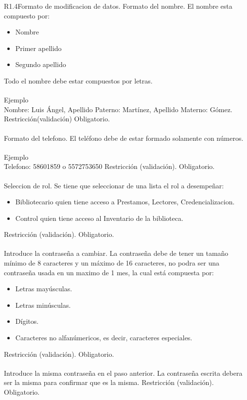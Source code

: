 \begin{BussinesRule}{R1.4}{Formato de modificacion de datos.} 
	\BRitem[Nombre:] Formato del nombre.
	\BRitem[Descripción:] El nombre esta compuesto por:
		\begin{itemize} 
			\item Nombre
			\item Primer apellido
			\item Segundo apellido 
		\end{itemize}
		Todo el nombre debe estar compuestos por letras.\\\\
	Ejemplo \\
	Nombre: Luis Ángel, Apellido Paterno: Martínez, Apellido Materno: Gómez.
	\BRitem[Tipo:] Restricción(validación)
	\BRitem[Nivel:] Obligatorio.\\\\

	\BRitem[Telefono:] Formato del telefono.
	\BRitem[Descripción:] El teléfono debe de estar formado solamente con números.\\\\
	Ejemplo \\
	Telefono: 58601859 o 5572753650
	\BRitem[Tipo:] Restricción (validación).
	\BRitem[Nivel:] Obligatorio.\\\\

	 Seleccion de rol.
	\BRitem[Descripción:] Se tiene que seleccionar de una lista el rol a desempeñar:
		\begin{itemize} 
			\item Bibliotecario quien tiene acceso a Prestamos, Lectores, Credencializacion.
			\item Control quien tiene acceso al Inventario de la biblioteca.
		\end{itemize}
	\BRitem[Tipo:] Restricción (validación).
	\BRitem[Nivel:] Obligatorio.\\\\

	\BRitem[Contraseña:] Introduce la contraseña a cambiar.
	\BRitem[Descripción:] La contraseña debe de tener un tamaño mínimo de 8 caracteres y un máximo de 16 caracteres, no podra ser una contraseña usada en un maximo de 1 mes, la cual está compuesta por:
		\begin{itemize}	
			\item Letras mayúsculas.
			\item Letras minúsculas.
			\item Dígitos.
			\item Caracteres no alfanúmericos, es decir, caracteres especiales.
		\end{itemize}
	\BRitem[Tipo:] Restricción (validación).
	\BRitem[Nivel:] Obligatorio.\\\\

	 Introduce la misma contraseña en el paso anterior.
	\BRitem[Descripción:] La contraseña escrita debera ser la misma para confirmar que es la misma.
	\BRitem[Tipo:] Restricción (validación).
	\BRitem[Nivel:] Obligatorio.

\end{BussinesRule}

